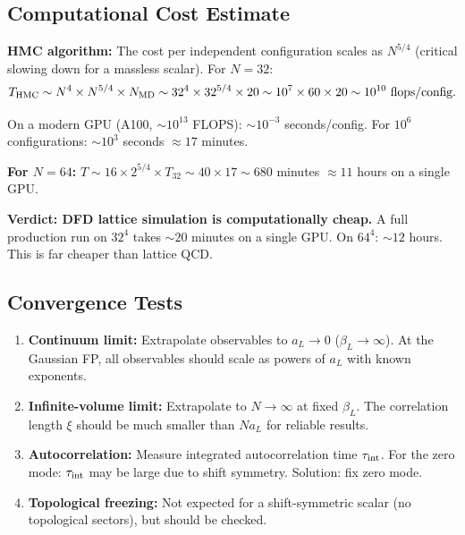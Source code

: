 \documentclass[11pt,a4paper]{article}
\begin{document}
\subsection{Computational Cost Estimate}

\textbf{HMC algorithm:} The cost per independent configuration scales as $N^{5/4}$ (critical slowing down for a massless scalar). For $N = 32$:
\begin{equation}
T_{\rm HMC} \sim N^4 \times N^{5/4} \times N_{\rm MD} \sim 32^4 \times 32^{5/4} \times 20 \sim 10^7 \times 60 \times 20 \sim 10^{10} \text{ flops/config}.
\end{equation}

On a modern GPU (A100, $\sim 10^{13}$ FLOPS): $\sim 10^{-3}$ seconds/config. For $10^6$ configurations: $\sim 10^3$ seconds $\approx 17$ minutes.

\textbf{For $N = 64$:} $T \sim 16 \times 2^{5/4} \times T_{32} \sim 40 \times 17 \sim 680$ minutes $\approx 11$ hours on a single GPU.

\textbf{Verdict: DFD lattice simulation is computationally cheap.} A full production run on $32^4$ takes $\sim 20$ minutes on a single GPU. On $64^4$: $\sim 12$ hours. This is far cheaper than lattice QCD.

\subsection{Convergence Tests}

\begin{enumerate}
\item \textbf{Continuum limit:} Extrapolate observables to $a_L \to 0$ ($\beta_L \to \infty$). At the Gaussian FP, all observables should scale as powers of $a_L$ with known exponents.

\item \textbf{Infinite-volume limit:} Extrapolate to $N \to \infty$ at fixed $\beta_L$. The correlation length $\xi$ should be much smaller than $N a_L$ for reliable results.

\item \textbf{Autocorrelation:} Measure integrated autocorrelation time $\tau_{\rm int}$. For the zero mode: $\tau_{\rm int}$ may be large due to shift symmetry. Solution: fix zero mode.

\item \textbf{Topological freezing:} Not expected for a shift-symmetric scalar (no topological sectors), but should be checked.
\end{enumerate}
\end{document}
